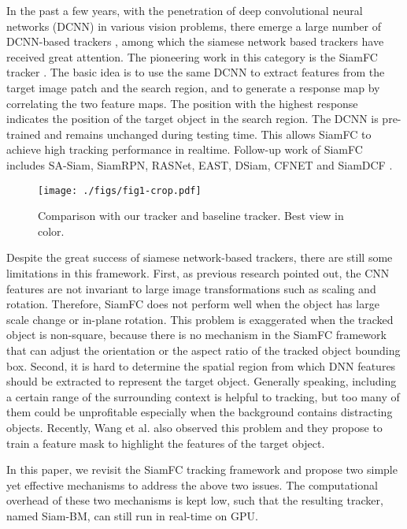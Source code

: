 \documentclass[runningheads]{llncs}
\begin{document}
In the past a few years, with the penetration of deep convolutional neural networks (DCNN) in various vision problems, there emerge a large number of DCNN-based trackers \cite{SASiam,SiamFC,DeepSRDCF,MDNET,ECO,SINT,SiamDCF,HCF,BranchOut,CSRDCF,GOTURN,CCOT}, among which the siamese network based trackers have received great attention. The pioneering work in this category is the SiamFC tracker \cite{SiamFC}. The basic idea is to use the same DCNN to extract features from the target image patch and the search region, and to generate a response map by correlating the two feature maps. The position with the highest response indicates the position of the target object in the search region. The DCNN is pre-trained and remains unchanged during testing time. This allows SiamFC to achieve high tracking performance in realtime. Follow-up work of SiamFC includes SA-Siam, SiamRPN, RASNet, EAST, DSiam, CFNET and SiamDCF \cite{SASiam,SiamRPN,RASNet,EAST,DSiam,CFNET,SiamDCF}. 
    \begin{figure}[t!]
        \begin{center}
        \texttt{[image: ./figs/fig1-crop.pdf]}
        \end{center}
        \caption{Comparison with our tracker and baseline tracker. Best view in color.}
        \label{fig:comp_baseline_ours_gallery}
    \end{figure}
    
Despite the great success of siamese network-based trackers, there are still some limitations in this framework. 
    First, as previous research \cite{ORN,TICNN,STN} pointed out, the CNN features are not invariant to large image transformations such as scaling and rotation. Therefore, SiamFC does not perform well when the object has large scale change or in-plane rotation. This problem is exaggerated when the tracked object is non-square, because there is no mechanism in the SiamFC framework that can adjust the orientation or the aspect ratio of the tracked object bounding box.
    Second, it is hard to determine the spatial region from which DNN features should be extracted to represent the target object. Generally speaking, including a certain range of the surrounding context is helpful to tracking, but too many of them could be unprofitable especially when the background contains distracting objects. Recently, Wang et al. \cite{RASNet} also observed this problem and they propose to train a feature mask to highlight the features of the target object.


In this paper, we revisit the SiamFC tracking framework and propose two simple yet effective mechanisms to address the above two issues. The computational overhead of these two mechanisms is kept low, such that the resulting tracker, named Siam-BM, can still run in real-time on GPU. 
    
\end{document}
